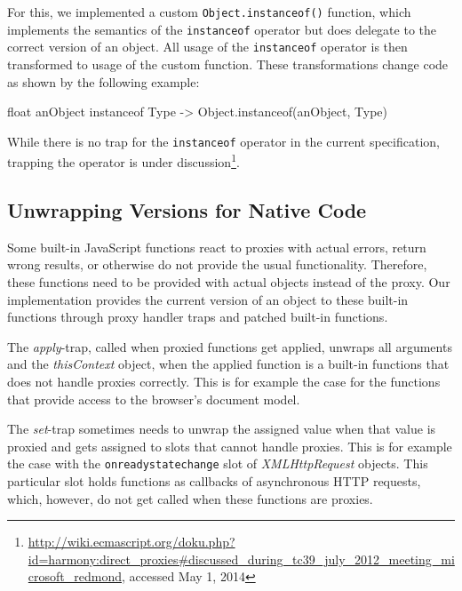 For this, we implemented a custom \lstinline{Object.instanceof()} function, which implements the semantics of the \lstinline{instanceof} operator but does delegate to the correct version of an object.
All usage of the \lstinline{instanceof} operator is then transformed to usage of the custom function.
These transformations change code as shown by the following example: 

\begin{code}[]{}{float}
anObject instanceof Type -> Object.instanceof(anObject, Type)
\end{code}
\iffalse
\end{verbatim}\fi

While there is no trap for the \lstinline{instanceof} operator in the current specification, trapping the operator is under discussion\footnote{\url{http://wiki.ecmascript.org/doku.php?id=harmony:direct_proxies\#discussed_during_tc39_july_2012_meeting_microsoft_redmond}, accessed May 1, 2014}.


\subsection{Unwrapping Versions for Native Code} \label{subsec:IMPLEMENTATION:4.3}

Some built-in JavaScript functions react to proxies with actual errors, return wrong results, or otherwise do not provide the usual functionality.
Therefore, these functions need to be provided with actual objects instead of the proxy.
Our implementation provides the current version of an object to these built-in functions through proxy handler traps and patched built-in functions.

The \emph{apply}-trap, called when proxied functions get applied, unwraps all arguments and the \emph{thisContext} object, when the applied function is a built-in functions that does not handle proxies correctly.
This is for example the case for the functions that provide access to the browser's document model.

The \emph{set}-trap sometimes needs to unwrap the assigned value when that value is proxied and gets assigned to slots that cannot handle proxies.
This is for example the case with the \lstinline{onreadystatechange} slot of \emph{XMLHttpRequest} objects.
This particular slot holds functions as callbacks of asynchronous HTTP requests, which, however, do not get called when these functions are proxies.

